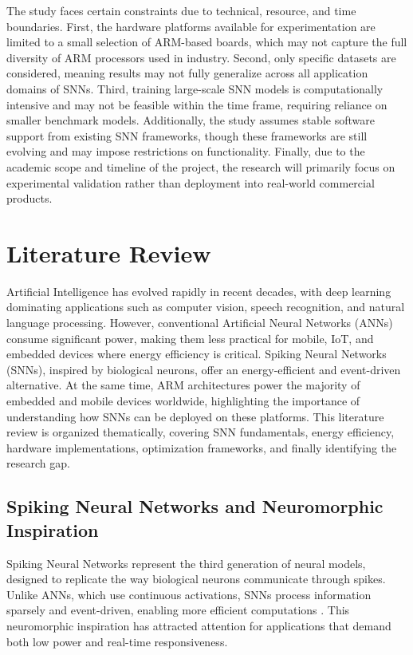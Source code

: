\documentclass[a4paper,12pt]{article}
\begin{document}
	The study faces certain constraints due to technical, resource, and time boundaries. First, the hardware platforms available for experimentation are limited to a small selection of ARM-based boards, which may not capture the full diversity of ARM processors used in industry. Second, only specific datasets are considered, meaning results may not fully generalize across all application domains of SNNs. Third, training large-scale SNN models is computationally intensive and may not be feasible within the time frame, requiring reliance on smaller benchmark models. Additionally, the study assumes stable software support from existing SNN frameworks, though these frameworks are still evolving and may impose restrictions on functionality. Finally, due to the academic scope and timeline of the project, the research will primarily focus on experimental validation rather than deployment into real-world commercial products.
	
	\section{Literature Review}
	Artificial Intelligence has evolved rapidly in recent decades, with deep learning dominating applications such as computer vision, speech recognition, and natural language processing. However, conventional Artificial Neural Networks (ANNs) consume significant power, making them less practical for mobile, IoT, and embedded devices where energy efficiency is critical. Spiking Neural Networks (SNNs), inspired by biological neurons, offer an energy-efficient and event-driven alternative. At the same time, ARM architectures power the majority of embedded and mobile devices worldwide, highlighting the importance of understanding how SNNs can be deployed on these platforms. This literature review is organized thematically, covering SNN fundamentals, energy efficiency, hardware implementations, optimization frameworks, and finally identifying the research gap.
	
	\subsection{Spiking Neural Networks and Neuromorphic Inspiration}
	Spiking Neural Networks represent the third generation of neural models, designed to replicate the way biological neurons communicate through spikes. Unlike ANNs, which use continuous activations, SNNs process information sparsely and event-driven, enabling more efficient computations \citep{Bouvier2019}. This neuromorphic inspiration has attracted attention for applications that demand both low power and real-time responsiveness.
	
\end{document}
